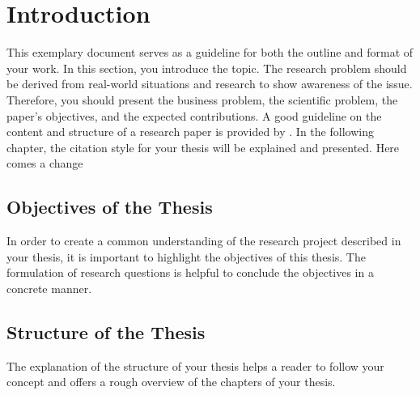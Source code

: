 \chapter{Introduction}

This exemplary document serves as a guideline for both the outline and format of your work. In this section, you introduce the topic. The research problem should be derived from real-world situations and research to show awareness of the issue. Therefore, you should present the business problem, the scientific problem, the paper’s objectives, and the expected contributions. A good guideline on the content and structure of a research paper is provided by \citet[pp.~46–54]{venkatesh2011}. In the following chapter, the citation style for your thesis will be explained and presented. Here comes a change

\section{Objectives of the Thesis}
In order to create a common understanding of the research project described in your thesis, it is important to highlight the objectives of this thesis. The formulation of research questions is helpful to conclude the objectives in a concrete manner.
\section{Structure of the Thesis}
The explanation of the structure of your thesis helps a reader to follow your concept and offers a rough overview of the chapters of your thesis.
